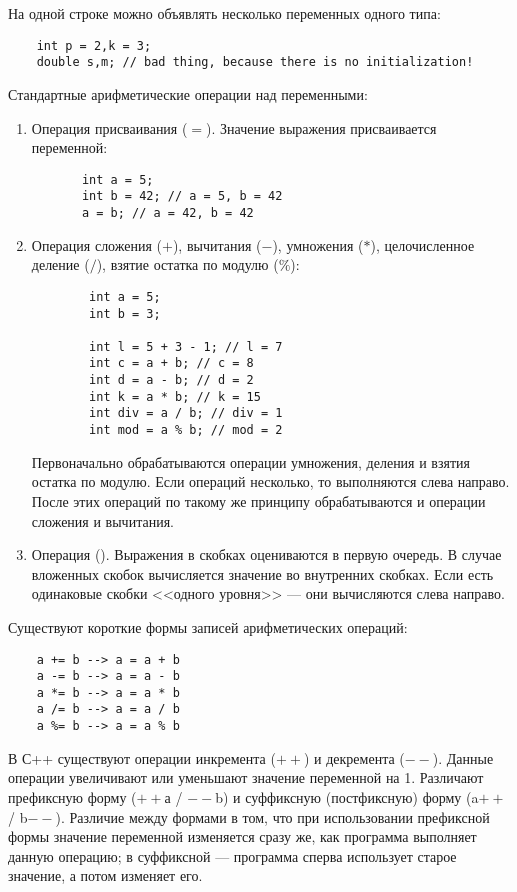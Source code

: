 На одной строке можно объявлять несколько переменных одного типа:
\begin{lstlisting}
    int p = 2,k = 3;
    double s,m; // bad thing, because there is no initialization!
\end{lstlisting}

Стандартные арифметические операции над переменными:
\begin{enumerate}
    \item Операция присваивания ($=$). Значение выражения присваивается переменной:
    \begin{lstlisting}
       int a = 5;
       int b = 42; // a = 5, b = 42
       a = b; // a = 42, b = 42
    \end{lstlisting}
    \item Операция сложения ($+$), вычитания ($-$), умножения ($*$), целочисленное деление ($/$), взятие остатка по модулю ($\%$):
    \begin{lstlisting}
        int a = 5;
        int b = 3;

        int l = 5 + 3 - 1; // l = 7
        int c = a + b; // c = 8
        int d = a - b; // d = 2
        int k = a * b; // k = 15
        int div = a / b; // div = 1
        int mod = a % b; // mod = 2
    \end{lstlisting}

    Первоначально обрабатываются операции умножения, деления и взятия остатка по модулю. Если операций несколько, то выполняются слева направо. После этих операций по такому же принципу обрабатываются и операции сложения и вычитания.

    \item Операция (). Выражения в скобках оцениваются в первую очередь. В случае вложенных скобок вычисляется значение во внутренних скобках. Если есть одинаковые скобки <<одного уровня>> --- они вычисляются слева направо.
\end{enumerate}

Существуют короткие формы записей арифметических операций:
\begin{lstlisting}
    a += b --> a = a + b
    a -= b --> a = a - b
    a *= b --> a = a * b
    a /= b --> a = a / b
    a %= b --> a = a % b
\end{lstlisting}

В С++ существуют операции инкремента ($++$) и декремента ($--$). Данные операции увеличивают или уменьшают значение переменной на 1. Различают префиксную форму ($++$а / $--$b) и суффиксную (постфиксную) форму (a$++$ / b$--$). Различие между формами в том, что при использовании префиксной формы значение переменной изменяется сразу же, как программа выполняет данную операцию; в суффиксной --- программа сперва использует старое значение, а потом изменяет его.


